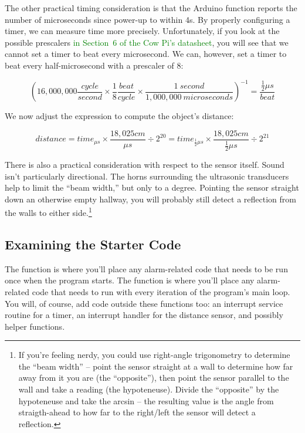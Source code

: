 The other practical timing consideration is that the Arduino function  reports the number of microseconds since power-up to within 4\textmu s.
By properly configuring a timer, we can measure time more precisely.
Unfortunately, if you look at the possible prescalers \textcolor{green}{in Section~6 of the Cow Pi's datasheet}, you will see that we cannot set a timer to beat every microsecond.
We can, however, set a timer to beat every half-microsecond with a prescaler of 8:

\[
    \left(16,000,000\frac{cycle}{second} \times \frac{1}{8}\frac{beat}{cycle} \times \frac{1~second}{1,000,000~microseconds}\right)^{-1} = \frac{\frac{1}{2}\mu s}{beat}
\]

We now adjust the expression to compute the object's distance:

\[
    distance = time_{\mu s} \times \frac{18,025 cm}{\mu s} \div 2^{20} = time_{\frac{1}{2}\mu s} \times \frac{18,025 cm}{\frac{1}{2}\mu s} \div 2^{21}
\]

There is also a practical consideration with respect to the sensor itself.
Sound isn't particularly directional.
The horns surrounding the ultrasonic transducers help to limit the ``beam width,'' but only to a degree.
Pointing the sensor straight down an otherwise empty hallway, you will probably still detect a reflection from the walls to either side.\footnote{
    If you're feeling nerdy, you could use right-angle trigonometry to determine the ``beam width'' --
    point the sensor straight at a wall to determine how far away from it you are (the ``opposite''), then point the sensor parallel to the wall and take a reading (the hypoteneuse).
    Divide the ``opposite'' by the hypoteneuse and take the arcsin -- the resulting value is the angle from straigth-ahead to how far to the right/left the sensor will detect a reflection.
}

\subsection{Examining the Starter Code}

The  function is where you'll place any alarm-related code that needs to be run once when the program starts.
The  function is where you'll place any alarm-related code that needs to run with every iteration of the program's main loop.
You will, of course, add code outside these functions too: an interrupt service routine for a timer, an interrupt handler for the distance sensor, and possibly helper functions.

